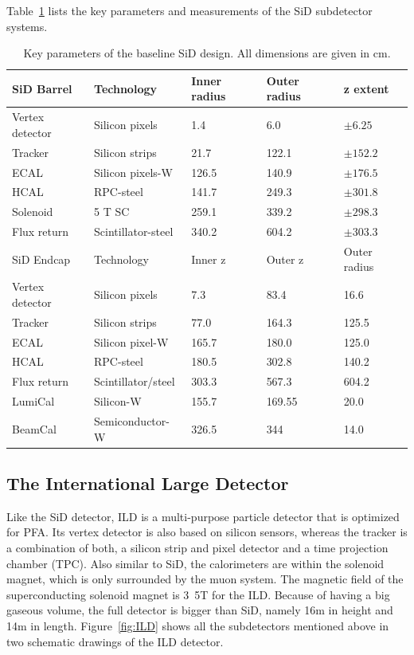 Table~\ref{tab:KeyParametersSiD} lists the key parameters and measurements of the SiD subdetector systems.

\begin{table}
\caption{Key parameters of the baseline SiD design. All dimensions are given in cm.\cite{SiDBkgNote}}
\label{tab:KeyParametersSiD}
\centering
\begin{tabularx}{0.81\textwidth}{l|llll}
\hline\hline
SiD Barrel & Technology & Inner radius & Outer radius & z extent\\
\hline
Vertex detector & Silicon pixels & 1.4 & 6.0 & $\pm 6.25$ \\
Tracker & Silicon strips & 21.7 & 122.1 & $\pm 152.2$ \\
ECAL & Silicon pixels-W & 126.5 & 140.9 & $\pm 176.5$ \\
HCAL & RPC-steel & 141.7 & 249.3 & $\pm 301.8$ \\
Solenoid & 5 T SC & 259.1 & 339.2 & $\pm 298.3$ \\
Flux return & Scintillator-steel & 340.2 & 604.2 & $\pm 303.3$ \\
\hline
SiD Endcap & Technology & Inner z & Outer z & Outer radius\\
\hline
Vertex detector & Silicon pixels & 7.3 & 83.4 & 16.6 \\
Tracker & Silicon strips & 77.0 & 164.3 & 125.5 \\
ECAL & Silicon pixel-W & 165.7 & 180.0 & 125.0 \\
HCAL & RPC-steel & 180.5 & 302.8 & 140.2 \\
Flux return & Scintillator/steel & 303.3 & 567.3 & 604.2 \\
LumiCal & Silicon-W & 155.7 & 169.55 &  20.0 \\
BeamCal & Semiconductor-W & 326.5 & 344 & 14.0 \\
\hline\hline
\end{tabularx}
\end{table}

\subsection{The International Large Detector}

Like the SiD detector, ILD is a multi-purpose particle detector that is optimized for PFA.
Its vertex detector is also based on silicon sensors, whereas the tracker is a combination of both, a silicon strip and pixel detector and a time projection chamber (TPC).
Also similar to SiD, the calorimeters are within the solenoid magnet, which is only surrounded by the muon system.
The magnetic field of the superconducting solenoid magnet is \unit{3.5}{T} for the ILD.
Because of having a big gaseous volume, the full detector is bigger than SiD, namely \unit{16}{m} in height and \unit{14}{m} in length.
Figure~\ref{fig:ILD} shows all the subdetectors mentioned above in two schematic drawings of the ILD detector.

